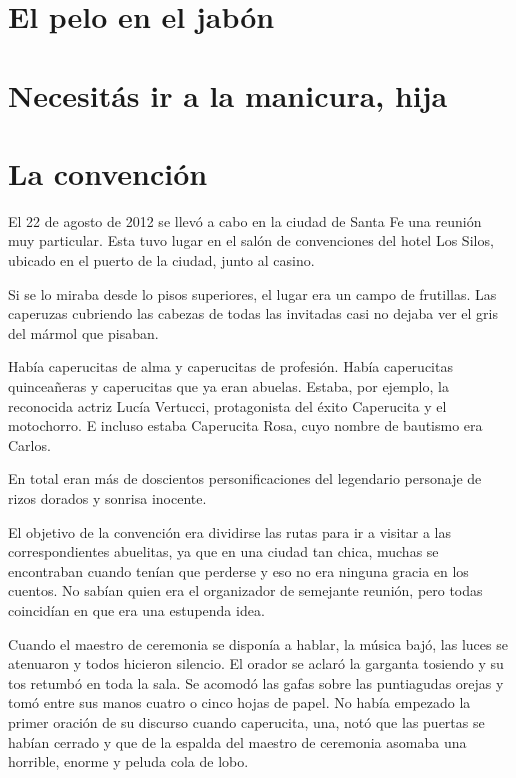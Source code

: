 \documentclass[11pt,twoside,openright,a6paper]{book}
\begin{document}
\chapter*{El pelo en el jabón}


\chapter*{Necesitás ir a la manicura, hija}

\chapter*{La convención}

El 22 de agosto de 2012 se llevó a cabo en la ciudad de Santa Fe una reunión muy particular. Esta tuvo lugar en el salón de convenciones del hotel Los Silos, ubicado en el puerto de la ciudad, junto al casino.

Si se lo miraba desde lo pisos superiores, el lugar era un campo de frutillas. Las caperuzas cubriendo las cabezas de todas las invitadas casi no dejaba ver el gris del mármol que pisaban.

Había caperucitas de alma y caperucitas de profesión. Había caperucitas quinceañeras y caperucitas que ya eran abuelas.
Estaba, por ejemplo, la reconocida actriz Lucía Vertucci, protagonista del éxito Caperucita y el motochorro. E incluso estaba Caperucita Rosa, cuyo nombre de bautismo era Carlos.

En total eran más de doscientos personificaciones del legendario personaje de rizos dorados y sonrisa inocente.

El objetivo de la convención era dividirse las rutas para ir a visitar a las correspondientes abuelitas, ya que en una ciudad tan chica, muchas se encontraban cuando tenían que perderse y eso no era ninguna gracia en los cuentos. No sabían quien era el organizador de semejante reunión, pero todas coincidían en que era una estupenda idea.

Cuando el maestro de ceremonia se disponía a hablar, la música bajó, las luces se atenuaron y todos hicieron silencio. El orador se aclaró la garganta tosiendo y su tos retumbó en toda la sala. Se acomodó las gafas sobre las puntiagudas orejas y tomó entre sus manos cuatro o cinco hojas de papel. No había empezado la primer oración de su discurso cuando caperucita, una, notó que las puertas se habían cerrado y que de la espalda del maestro de ceremonia asomaba una horrible, enorme y peluda cola de lobo.
\end{document}
